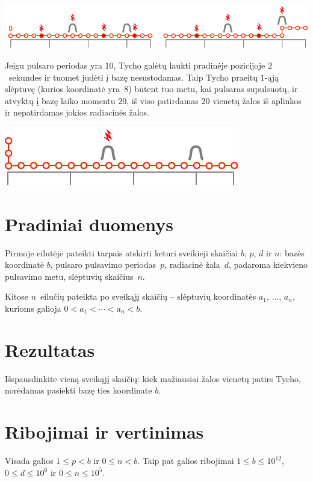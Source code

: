 \includegraphics[width=.8\textwidth]{img/sample1_2.pdf}

Jeigu pulsaro periodas yra $10$, Tycho galėtų laukti pradinėje pozicijoje $2$~sekundes ir tuomet judėti į bazę nesustodamas.
Taip Tycho praeitų $1$-ąją slėptuvę (kurios koordinatė yra~$8$) būtent tuo metu, kai pulsaras supulsuotų, ir atvyktų į bazę laiko momentu $20$, iš viso patirdamas $20$ vienetų žalos iš aplinkos ir nepatirdamas jokios radiacinės žalos.	

\includegraphics[width=.4\textwidth]{img/sample3.pdf}

\section*{Pradiniai duomenys}

Pirmoje eilutėje pateikti tarpais atskirti keturi sveikieji skaičiai $b$, $p$, $d$ ir $n$:
bazės koordinatė $b$,
pulsaro pulsavimo periodas~$p$,
radiacinė žala~$d$, padaroma kiekvieno pulsavimo metu,
slėptuvių skaičius~$n$.

Kitose $n$~eilučių pateikta po sveikąjį skaičių -- slėptuvių koordinatės $a_1$, $\ldots$, $a_n$, kurioms galioja
$0<a_1<\cdots <a_n< b$. %

\section*{Rezultatas}

Išspausdinkite vieną sveikąjį skaičių: kiek mažiausiai žalos vienetų patirs Tycho, norėdamas pasiekti bazę ties koordinate $b$.

\section*{Ribojimai ir vertinimas}

Visada galios
$1\leq p < b$ %
ir
$0\leq n < b$. %
Taip pat galios ribojimai
$1\leq b\leq 10^{12}$, %
$0\leq d \leq 10^6$ %
ir
$0\leq n \leq 10^5$. %

